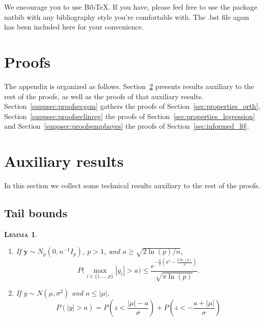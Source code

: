 \documentclass[
  12pt]{article}
\newcommand{\by}{\mathbf{y}}
\newtheorem{lem}[thm]{\textsc{Lemma}}
\begin{document}
We encourage you to use BibTeX. If you have, please feel free to use the
package natbib with any bibliography style you're comfortable with. The
.bst file agsm has been included here for your convenience. 


  

\section{Proofs}\label{app:proofs}

\renewcommand{\theequation}{\thesection pp.\arabic{equation}}


The appendix is organized as follows. Section~\ref{suppsec:auxiliary} presents results auxiliary to the rest of the proofs, as well as the proofs of that auxiliary results. Section~\ref{suppsec:proofsecgsm} gathers the proofs of Section~\ref{sec:properties_orth}, Section~\ref{suppsec:proofseclinreg} the proofs of Section~\ref{sec:properties_legression} and Section~\ref{suppsec:proofsempbayes} the proofs of Section~\ref{sec:informed_l0}.


\section{Auxiliary results}\label{suppsec:auxiliary}

In this section we collect some technical results auxiliary to the rest of the proofs.

\subsection{Tail bounds}

\begin{lem}\label{lemma:3tailbounds}
\begin{enumerate}[label=(\roman*)]
    \item If $\by\sim N_p(0,n^{-1}I_p)$, $p>1$, and $a \geq \sqrt{2\ln(p)/n}$, $$P\Big(\underset{i\in\{1,\ldots,p\}}{\max}|y_i|> a \Big) \leq \frac{e^{-\frac{n}{2}\left(a^2-\frac{2\ln (p)}{n}\right)}}{\sqrt{\pi\ln (p)}}.$$
    \item If $y\sim N(\mu,\sigma^2)$ and $a\leq|\mu|$, $$P(|y|>a)  = P\left(z<\frac{|\mu|-a}{\sigma}\right) + P\left(z<-\frac{a+|\mu|}{\sigma}\right)$$
\end{enumerate}
\end{lem}
\end{document}
